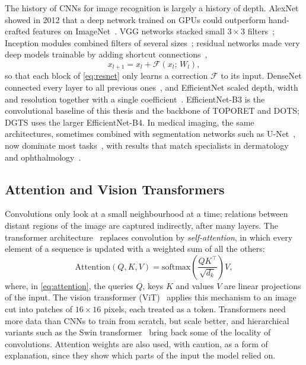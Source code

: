 The history of CNNs for image recognition is largely a history of depth. AlexNet showed in
2012 that a deep network trained on GPUs could outperform hand-crafted
features on ImageNet~\cite{krizhevsky2012imagenet,deng2009imagenet}. VGG networks stacked
small $3\times3$ filters~\cite{simonyan2015vgg}; Inception modules combined filters of
several sizes~\cite{szegedy2016inception}; residual networks made very deep models
trainable by adding shortcut connections~\cite{he2016resnet},
\begin{equation}
x_{l+1} = x_l + \mathcal{F}(x_l;\,W_l),
\label{eq:resnet}
\end{equation}
so that each block of \cref{eq:resnet} only learns a correction $\mathcal{F}$ to its input. DenseNet connected
every layer to all previous ones~\cite{huang2017densenet}, and EfficientNet scaled depth,
width and resolution together with a single coefficient~\cite{tan2019efficientnet}.
EfficientNet-B3 is the convolutional baseline of this thesis and the backbone of TOPORET
and DOTS; DGTS uses the larger EfficientNet-B4. In medical
imaging, the same architectures, sometimes combined with segmentation networks such as
U-Net~\cite{ronneberger2015unet}, now dominate most tasks~\cite{litjens2017survey}, with
results that match specialists in dermatology~\cite{esteva2017dermatologist} and
ophthalmology~\cite{gulshan2016jama}.

\subsection{Attention and Vision Transformers}

Convolutions only look at a small neighbourhood at a time; relations between distant
regions of the image are captured indirectly, after many layers. The transformer
architecture~\cite{vaswani2017attention} replaces convolution by \emph{self-attention}, in
which every element of a sequence is updated with a weighted sum of all the others:
\begin{equation}
\mathrm{Attention}(Q,K,V) = \mathrm{softmax}\!\left(\frac{QK^\top}{\sqrt{d_k}}\right)V,
\label{eq:attention}
\end{equation}
where, in \cref{eq:attention}, the queries $Q$, keys $K$ and values $V$ are linear projections of the input. The
vision transformer (ViT)~\cite{dosovitskiy2021vit} applies this mechanism to an image cut
into patches of $16\times16$ pixels, each treated as a token. Transformers need more data
than CNNs to train from scratch, but scale better, and hierarchical variants such as the
Swin transformer~\cite{liu2021swin} bring back some of the locality of convolutions.
Attention weights are also used, with caution, as a form of explanation, since they show
which parts of the input the model relied on.


